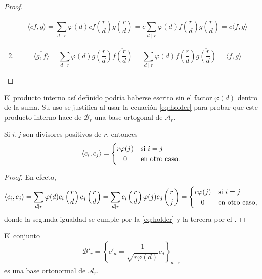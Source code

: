 \begin{proof}
\begin{enumerate}[label=\textnormal{(\roman*)}]
\begin{equation*}
    \langle c f,g \rangle = \sum_{d \mid r} \varphi(d) c f \left( \frac{r}{d} \right) \overline{g \left( \frac{r}{d} \right)} = c \sum_{d \mid r} \varphi(d) f \left( \frac{r}{d} \right) \overline{g\left( \frac{r}{d} \right)} = c \langle f,g \rangle
\end{equation*}
\item \begin{equation*}
    \overline{\langle g,f \rangle} = \overline{\sum_{d \mid r} \varphi(d) g \left( \frac{r}{d} \right) \overline{f \left( \frac{r}{d} \right)}} = \sum_{d \mid r} \varphi(d) f \left( \frac{r}{d} \right) \overline{g \left( \frac{r}{d} \right)} = \langle f,g \rangle
\end{equation*}
\end{enumerate}
\end{proof}

El producto interno así definido podría haberse escrito sin el factor $\varphi(d)$ dentro de la suma. Su uso se justifica al usar la ecuación \eqref{eq:holder} para probar que este producto interno hace de $\mathcal{B}_r$ una base ortogonal de $\mathcal{A}_r$.

\begin{proposition}
Si $i,j$ son divisores positivos de $r$, entonces
\begin{equation*}
    \langle c_i,c_j \rangle = \begin{cases}
        \hfil r \varphi(j) & \text{si } i=j \\
        \hfil 0 & \text{en otro caso}.
    \end{cases}
\end{equation*}
\end{proposition}
\begin{proof}
En efecto,
\begin{equation*}
    \langle c_i,c_j \rangle = \sum_{d \mid r} \varphi(d) c_i \left( \frac{r}{d} \right) c_j \left( \frac{r}{d} \right) = \sum_{d \mid r} c_i \left( \frac{r}{d} \right) \varphi(j) c_d \left( \frac{r}{j} \right) = 
    \begin{cases}
        \hfil r \varphi(j) & \text{si } i=j \\
        \hfil 0 & \text{en otro caso},
    \end{cases}
\end{equation*}
donde la segunda igualdad se cumple por la \cref{eq:holder} y la tercera por el .
\end{proof}

\begin{corollary}
El conjunto
\begin{equation*}
    \mathcal{B}'_r = \left\{ c'_d = \frac{1}{\sqrt{r \varphi(d)}} c_d \right\}_{d \mid r}
\end{equation*}
es una base ortonormal de $\mathcal{A}_r$.
\end{corollary}

